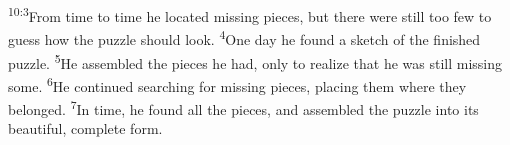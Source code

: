 \documentclass[openany,12pt,english]{book}
\newenvironment{para}{\par\pretolerance=100\tolerance=200\setlength{\emergencystretch}{0.6em}\relax}{\par}
\begin{document}
\begin{para}
    \textsuperscript{10:3}\thinspace{}From time to time he lo\-cat\-ed mis\-sing pieces, but there were still too few to guess how the puz\-zle should look.
    \textsuperscript{4}\thinspace{}One day he found a sketch of the fin\-ished puz\-zle.
    \textsuperscript{5}\thinspace{}He as\-sem\-bled the pieces he had, on\-ly to re\-al\-ize that he was still mis\-sing some.
    \textsuperscript{6}\thinspace{}He con\-tin\-ued search\-ing for mis\-sing pieces, plac\-ing them where they belonged.
    \textsuperscript{7}\thinspace{}In time, he found all the pieces, and as\-sem\-bled the puz\-zle in\-to its beau\-ti\-ful, com\-plete form.
\end{para}
\end{document}
